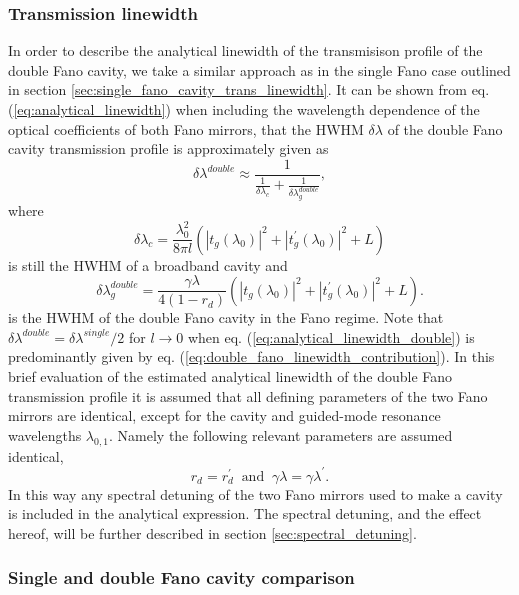 \subsubsection{Transmission linewidth}

In order to describe the analytical linewidth of the transmisison profile of the double Fano cavity, we take a similar approach as in the single Fano case outlined in section \ref{sec:single_fano_cavity_trans_linewidth}. It can be shown from eq. (\ref{eq:analytical_linewidth}) when including the wavelength dependence of the optical coefficients of both Fano mirrors, that the HWHM $\delta \lambda$ of the double Fano cavity transmission profile is approximately given as
\begin{equation}
    \delta \lambda^{double} \approx \frac{1}{\frac{1}{\delta \lambda_c} + \frac{1}{\delta \lambda_g^{double}}},
    \label{eq:analytical_linewidth_double}
\end{equation}
where 
\begin{equation}
    \delta \lambda_c = \frac{\lambda_0^2}{8 \pi l} (|t_g(\lambda_0)|^2 + |t_g^{\prime}(\lambda_0)|^2 + L)
\end{equation}
is still the HWHM of a broadband cavity and
\begin{equation}
    \delta \lambda_g^{double} = \frac{\gamma \lambda}{4 (1-r_d)}(|t_g(\lambda_0)|^2 + |t_g^{\prime}(\lambda_0)|^2 + L).
    \label{eq:double_fano_linewidth_contribution}
\end{equation}
is the HWHM of the double Fano cavity in the Fano regime. Note that $\delta \lambda^{double} = \delta \lambda^{single}/2$ for $l \rightarrow 0$ when eq. (\ref{eq:analytical_linewidth_double}) is predominantly given by eq. (\ref{eq:double_fano_linewidth_contribution}). In this brief evaluation of the estimated analytical linewidth of the double Fano transmission profile it is assumed that all defining parameters of the two Fano mirrors are identical, except for the cavity and guided-mode resonance wavelengths $\lambda_{0,1}$. Namely the following relevant parameters are assumed identical,
\begin{equation}
    r_d = r_d^{\prime} \: \text{ and } \: \gamma \lambda = \gamma \lambda^{\prime}.
\end{equation}
In this way any spectral detuning of the two Fano mirrors used to make a cavity is included in the analytical expression. The spectral detuning, and the effect hereof, will be further described in section \ref{sec:spectral_detuning}.

\subsubsection{Single and double Fano cavity comparison}

